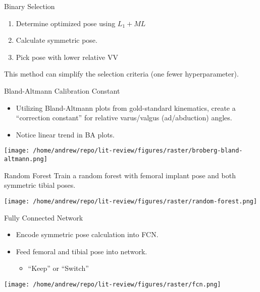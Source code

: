 \documentclass[presentation, aspectratio=1610]{beamer}
\begin{document}
\begin{frame}[label={sec:org95a65b2}]{Binary Selection}
\begin{enumerate}
\item Determine optimized pose using \(L_1 + ML\)
\item Calculate symmetric pose.
\item Pick pose with lower relative VV
\end{enumerate}

This method can simplify the selection criteria (one fewer hyperparameter).
\end{frame}
\begin{frame}[label={sec:orge3efbe1}]{Bland-Altmann Calibration Constant}
\begin{itemize}
\item Utilizing Bland-Altmann plots from gold-standard kinematics, create a ``correction constant'' for relative varus/valgus (ad/abduction) angles.
\item Notice linear trend in BA plots.
\end{itemize}
\begin{center}
\texttt{[image: /home/andrew/repo/lit-review/figures/raster/broberg-bland-altmann.png]}
\end{center}
\end{frame}


\begin{frame}[label={sec:org7785781}]{Random Forest}
Train a random forest with femoral implant pose and both symmetric tibial poses.
\begin{center}
\texttt{[image: /home/andrew/repo/lit-review/figures/raster/random-forest.png]}
\end{center}
\end{frame}
\begin{frame}[label={sec:org40256cc}]{Fully Connected Network}
\begin{itemize}
\item Encode symmetric pose calculation into FCN.
\item Feed femoral and tibial pose into network.
\begin{itemize}
\item ``Keep'' or ``Switch''
\end{itemize}
\end{itemize}
\begin{center}
\texttt{[image: /home/andrew/repo/lit-review/figures/raster/fcn.png]}
\end{center}
\end{frame}
\end{document}
